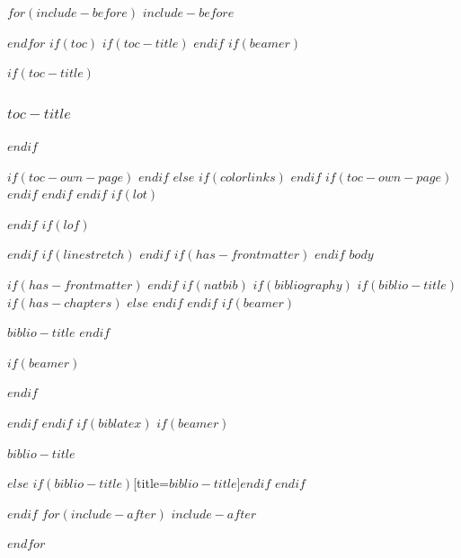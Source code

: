 \documentclass[
$if(fontsize)$
  $fontsize$,
$endif$
$if(lang)$
  $babel-lang$,
$endif$
$if(papersize)$
  $papersize$paper,
$else$
  paper=a4,
$endif$
$if(beamer)$
  ignorenonframetext,
$if(handout)$
  handout,
$endif$
$if(aspectratio)$
  aspectratio=$aspectratio$,
$endif$
$endif$
$for(classoption)$
  $classoption$$sep$,
$endfor$
  ,captions=tableheading
]{$if(beamer)$$documentclass$$else$$if(book)$scrbook$else$scrartcl$endif$$endif$}
\newif\ifbibliography
\begin{document}
$for(include-before)$
$include-before$

$endfor$
$if(toc)$
$if(toc-title)$
\renewcommand*\contentsname{$toc-title$}
$endif$
$if(beamer)$
\begin{frame}[allowframebreaks]
$if(toc-title)$
  \frametitle{$toc-title$}
$endif$
  \tableofcontents[hideallsubsections]
\end{frame}
$if(toc-own-page)$
\newpage
$endif$
$else$
{
$if(colorlinks)$
\hypersetup{linkcolor=$if(toccolor)$$toccolor$$else$$endif$}
$endif$
\setcounter{tocdepth}{$toc-depth$}
\tableofcontents
$if(toc-own-page)$
\newpage
$endif$
}
$endif$
$endif$
$if(lot)$
\listoftables
$endif$
$if(lof)$
\listoffigures
$endif$
$if(linestretch)$
$endif$
$if(has-frontmatter)$
\mainmatter
$endif$
$body$

$if(has-frontmatter)$
\backmatter
$endif$
$if(natbib)$
$if(bibliography)$
$if(biblio-title)$
$if(has-chapters)$
\renewcommand\bibname{$biblio-title$}
$else$
\renewcommand\refname{$biblio-title$}
$endif$
$endif$
$if(beamer)$
\begin{frame}[allowframebreaks]{$biblio-title$}
  \bibliographytrue
$endif$
  
$if(beamer)$
\end{frame}
$endif$

$endif$
$endif$
$if(biblatex)$
$if(beamer)$
\begin{frame}[allowframebreaks]{$biblio-title$}
  \bibliographytrue
  \printbibliography[heading=none]
\end{frame}
$else$
\printbibliography$if(biblio-title)$[title=$biblio-title$]$endif$
$endif$

$endif$
$for(include-after)$
$include-after$

$endfor$
\end{document}
